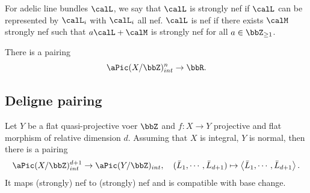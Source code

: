 For adelic line bundles $\calL$, we say that $\calL$ is strongly nef if $\calL$ can be represented by $\calL_i$ with $\calL_i$ all nef.
$\calL$ is nef if there exists $\calM$ strongly nef such that $a \calL + \calM$ is strongly nef for all $a \in \bbZ_{\geq 1}$.

\begin{theorem}[label=\labelNFM{thm:intersection-pairing}, status=draft, tag=0000000]
	There is a pairing
	\[ \aPic(X/\bbZ)_{int}^n \to \bbR. \]
\end{theorem}


\subsection[status=draft,tag=0000000,label=\labelNFM{subsec:deligne}]{Deligne pairing}


\begin{theorem}[label=\labelNFM{thm:thm}, status=draft, tag=0000000]
	Let $Y$ be a flat quasi-projective voer $\bbZ$ and $f: X \to Y$ projective and flat morphism of relative dimension $d$.
	Assuming that $X$ is integral, $Y$ is normal, then there is a pairing
	\[ \aPic(X/\bbZ)^{d+1}_{int} \to \aPic(Y/\bbZ)_{int}, \quad (\bar{L}_1,\cdots,\bar{L}_{d+1}) \mapsto \left< \bar{L}_1,\cdots,\bar{L}_{d+1} \right>. \]
	It maps (strongly) nef to (strongly) nef and is compatible with base change.
\end{theorem}




































